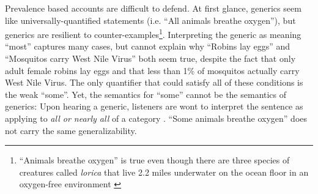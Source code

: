 \documentclass[10pt,letterpaper]{article}
\begin{document}
Prevalence based accounts are difficult to defend. 
At first glance, generics seem like universally-quantified statements (i.e. ``All animals breathe oxygen''), but generics are resilient to counter-examples\footnote{``Animals breathe oxygen'' is true even though there are three species of creatures called \emph{lorica} that live 2.2 miles underwater on the ocean floor in an oxygen-free environment \cite{Danovaro2010}}. 
Interpreting the generic as meaning ``most'' captures many cases, but cannot explain why ``Robins lay eggs'' and ``Mosquitos carry West Nile Virus'' both seem true, despite the fact that only adult female robins lay eggs and that less than 1\% of mosquitos actually carry West Nile Virus. 
The only quantifier that could satisfy all of these conditions is the weak ``some''.  
Yet, the semantics for ``some'' cannot be the semantics of generics:  Upon hearing a generic, listeners are wont to interpret the sentence as applying to \emph{all or nearly all} of a category \cite{Gelman2002, Cimpian2010}. 
``Some animals breathe oxygen'' does not carry the same generalizability.

%
\end{document}
